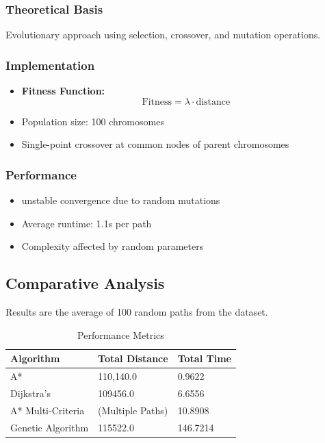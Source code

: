 \documentclass[conference]{IEEEtran}
\begin{document}
\subsubsection{Theoretical Basis}
Evolutionary approach using selection, crossover, and mutation operations.

\subsubsection{Implementation}
\begin{itemize}
    \item \textbf{Fitness Function:}
    \[
    \text{Fitness} = \lambda \cdot \text{distance}
    \]
    \item Population size: 100 chromosomes
    \item Single-point crossover at common nodes of parent chromosomes
\end{itemize}

\subsubsection{Performance}
\begin{itemize}
    \item unstable convergence due to random mutations
    \item Average runtime: 1.1s per path
    \item Complexity affected by random parameters
\end{itemize}



\subsection{Comparative Analysis}
Results are the average of 100 random paths from the dataset.
\begin{table}[ht]
    \centering
    \caption{Performance Metrics}
    \label{tab:type}
    \begin{tabular}{|l|l|l|}
    \hline
    \textbf{Algorithm} & \textbf{Total Distance} & \textbf{Total Time}  \\ \hline
    A* & 110,140.0 & 0.9622 \\ \hline
    Dijkstra's & 109456.0 & 6.6556 \\ \hline
    A* Multi-Criteria & (Multiple Paths) & 10.8908  \\ \hline
    Genetic Algorithm & 115522.0 & 146.7214 \\ \hline
    \end{tabular}
\end{table}
\end{document}
